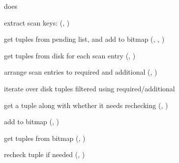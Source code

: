  does

\begin{nparts}
\item
  extract scan keys:  (,
  )
\item
  get tuples from pending list, and add to bitmap (,
  , )
\item
  get tuples from disk for each scan entry (,
  )
\item
  arrange scan entries to required and additional (,
  )
\item
  iterate over disk tuples filtered using required/additional
  \begin{iparts}
  \item
    get a tuple along with whether it needs rechecking (,
    )
  \item
    add to bitmap (,
    )
  \end{iparts}
\item
  get tuples from bitmap (,
  )
\item
  recheck tuple if needed (,
  )
\end{nparts}
